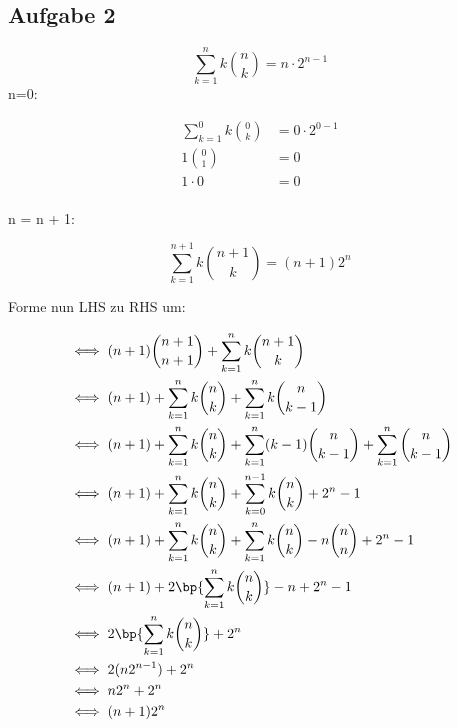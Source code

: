 \subsection*{Aufgabe 2}

\[ \sum_{k=1}^{n} k\binom{n}{k} = n \cdot 2^{n-1} \]
n=0:

\begin{align*}
\sum_{k=1}^{0} k\binom{0}{k} &= 0 \cdot 2^{0-1}  \\
1\binom{0}{1} &= 0 \\
1 \cdot 0 &= 0  \\
\end{align*}

n = n + 1:

\[ \sum_{k=1}^{n+1} k\binom{n+1}{k} = (n+1)2^{n}  \]

Forme nun LHS zu RHS um:

\begin{align*}
& \iff (n+1)\binom{n+1}{n+1} + \sum_{k=1}^{n}k\binom{n+1}{k} \\
& \iff (n+1) + \sum_{k=1}^{n}k\binom{n}{k} + \sum_{k=1}^{n}k\binom{n}{k-1} \\
& \iff (n+1) + \sum_{k=1}^{n}k\binom{n}{k} + \sum_{k=1}^{n}(k-1)\binom{n}{k-1} + \sum_{k=1}^{n}\binom{n}{k-1} \\
& \iff (n+1) + \sum_{k=1}^{n}k\binom{n}{k} + \sum_{k=0}^{n-1}k\binom{n}{k} + 2^{n} - 1 \\
& \iff (n+1) + \sum_{k=1}^{n}k\binom{n}{k} + \sum_{k=1}^{n}k\binom{n}{k} - n\binom{n}{n} + 2^{n} - 1 \\
& \iff (n+1) + 2\bp{\sum_{k=1}^{n}k\binom{n}{k}} - n + 2^{n} - 1 \\
& \iff 2\bp{\sum_{k=1}^{n}k\binom{n}{k}} + 2^{n} \\
& \iff 2(n2^{n-1}) + 2^{n} \\
& \iff n2^{n} + 2^{n} \\
& \iff (n+1)2^{n} \\
\end{align*}




